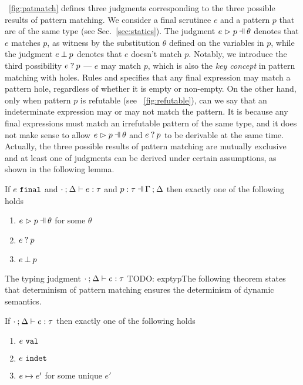 \documentclass[runningheads,envcountsame,a4paper]{llncs}
\newcommand{\todo}[1]{{\color{red} TODO: #1}}
\begin{document}



\figurename~\ref{fig:patmatch} defines three judgments corresponding to the
three possible results of pattern matching. We consider a final scrutinee $e$
and a pattern $p$ that are of the same type (see Sec.~\ref{sec:statics}). The
judgment $\hpatmatch{e}{p}{\theta}$ denotes that $e$ matches $p$, as witness by
the substitution $\theta$ defined on the variables in $p$, while the judgment
$e \mathbin{\bot} p$ denotes that $e$ doesn't match $p$. Notably, we introduce the
third possibility $e \mathbin{?} p$ --- $e$ may match $p$, which is also the
\textit{key concept} in pattern matching with holes. Rules \MMEHole and \MMHole
specifies that any final expression may match a pattern hole, regardless of
whether it is empty or non-empty. On the other hand, only when pattern $p$ is
refutable (see \figurename~\ref{fig:refutable}), can we say that an indeterminate
expression may or may not match the pattern. It is because any final expressions
must match an irrefutable pattern of the same type, and it does not make sense to allow
$\hpatmatch{e}{p}{\theta}$ and $e \mathbin{?} p$ to be derivable at the same time. Actually,
the three possible results of pattern matching are mutually exclusive and at
least one of judgments can be derived under certain assumptions, as shown in the
following lemma.

\begin{lemma}
  \label{lem:match-determinism}
  If $e ~\mathtt{final}$ and $\cdot \mathbin{;} \Delta \vdash e : \tau$ and $\hpattyp{p}{\tau}{\Gamma}{\Delta}$ then exactly one of the following holds
  \begin{enumerate}
    \item $\hpatmatch{e}{p}{\theta}$ for some $\theta$
    \item $e \mathbin{?} p$
    \item $e \mathbin{\bot} p$
  \end{enumerate}
\end{lemma}

The typing judgment $\cdot \mathbin{;} \Delta \vdash e : \tau$ \todo{exptyp}The following theorem states that determinism of pattern matching ensures the determinism of dynamic semantics.

\begin{theorem}[Determinism]
  \label{thrm:determinism}
  If $\cdot \mathbin{;} \Delta \vdash e : \tau$ then exactly one of the following holds
  \begin{enumerate}
    \item $e ~\mathtt{val}$
    \item $e ~\mathtt{indet}$
    \item $e \mapsto e'$ for some unique $e'$
  \end{enumerate}
\end{theorem}
\end{document}
